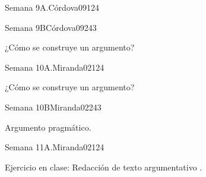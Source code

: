 \begin{syllabus}
\begin{unit}{Semana 9A.}{Córdova09}{12}{4}
\begin{topics}
   \end{topics}
   \begin{unitgoals}
      \item 
   \end{unitgoals}
\end{unit}

\begin{unit}{Semana 9B}{Córdova09}{24}{3}
   \begin{topics}
      \item ¿Cómo se construye un argumento?
   \end{topics}

   \begin{unitgoals}
      \item 
      \item
      \item 
      \end{unitgoals}
\end{unit}


\begin{unit}{Semana 10A.}{Miranda02}{12}{4}
   \begin{topics}
      \item ¿Cómo se construye un argumento?
   \end{topics}
   \begin{unitgoals}
      \item 
   \end{unitgoals}
\end{unit}

\begin{unit}{Semana 10B}{Miranda02}{24}{3}
   \begin{topics}
      \item Argumento pragmático.
   \end{topics}

   \begin{unitgoals}
      \item 
      \item
      \item 
      \end{unitgoals}
\end{unit}

\begin{unit}{Semana 11A.}{Miranda02}{12}{4}
   \begin{topics}
      \item  Ejercicio en clase: Redacción de texto argumentativo .
   \end{topics}
   \begin{unitgoals}
      \item 
   \end{unitgoals}
\end{unit}


\end{syllabus}
